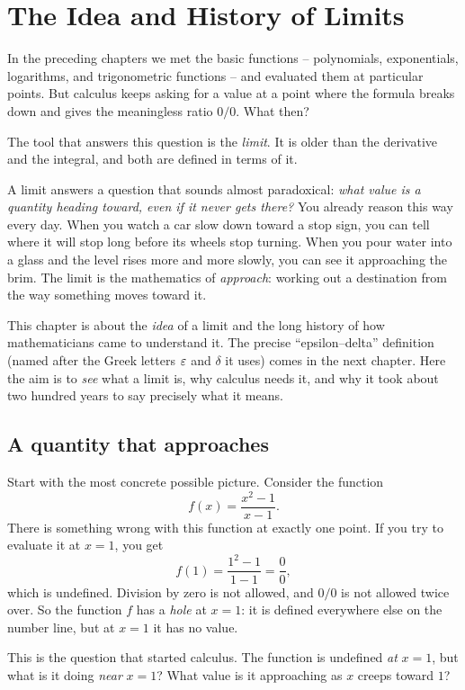 \chapter{The Idea and History of Limits}

In the preceding chapters we met the basic functions -- polynomials, exponentials,
logarithms, and trigonometric functions -- and evaluated them at particular points. But
calculus keeps asking for a value at a point where the formula breaks down and gives the
meaningless ratio $0/0$. What then?

The tool that answers this question is the \emph{limit}. It is older than the derivative and
the integral, and both are defined in terms of it.

A limit answers a question that sounds almost paradoxical: \emph{what value is a quantity heading
toward, even if it never gets there?} You already reason this way every day. When you watch a
car slow down toward a stop sign, you can tell where it will stop long before its wheels stop
turning. When you pour water into a glass and the level rises more and more slowly, you can see
it approaching the brim. The limit is the mathematics of \emph{approach}: working out a
destination from the way something moves toward it.

This chapter is about the \emph{idea} of a limit and the long history of how mathematicians came
to understand it. The precise ``epsilon--delta'' definition (named after the Greek letters $\varepsilon$
and $\delta$ it uses) comes in the next chapter. Here the aim is to \emph{see} what a limit is,
why calculus needs it, and why it took about two hundred years to say precisely what it means.

\section{A quantity that approaches}

Start with the most concrete possible picture. Consider the function
\[
  f(x) = \frac{x^2 - 1}{x - 1}.
\]
There is something wrong with this function at exactly one point. If you try to evaluate it at
$x = 1$, you get
\[
  f(1) = \frac{1^2 - 1}{1 - 1} = \frac{0}{0},
\]
which is undefined. Division by zero is not allowed, and $0/0$ is not allowed twice over. So
the function $f$ has a \emph{hole} at $x = 1$: it is defined everywhere else on the number
line, but at $x = 1$ it has no value.

This is the question that started calculus. The function is undefined \emph{at} $x = 1$,
but what is it doing \emph{near} $x = 1$? What value is it approaching as $x$ creeps toward
$1$?

